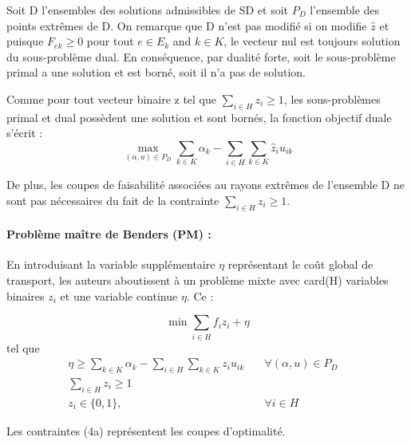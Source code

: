 Soit D l'ensembles des solutions admissibles de SD et soit $P_D$ l'ensemble des points extrêmes de D. On remarque que D n'est pas modifié si on modifie $\hat{z}$ et puisque $F_{ek} \geq 0$ pour tout $e \in E_k$ and $k \in K$, le vecteur nul est toujours solution du sous-problème dual. En conséquence, par dualité forte, soit le sous-problème primal a une solution et est borné, soit il n'a pas de solution.

Comme pour tout vecteur binaire z tel que $\sum_{i \in H} z_i \ge 1$, les sous-problèmes primal et dual possèdent une solution et sont bornés, la fonction objectif duale s'écrit :
\[ \max_{(\alpha,u) \in P_D} \sum_{k \in K}\alpha_k - \sum_{i \in H}\sum_{k \in K} \hat{z}_iu_{ik}\]

De plus, les coupes de faisabilité associées au rayons extrêmes de l'ensemble D ne sont pas nécessaires du fait de la contrainte $\sum_{i \in H} z_i \ge 1$. 




\paragraph{Problème maître de Benders (PM) :} En introduisant la variable supplémentaire $\eta$ représentant le coût global de transport, les auteurs aboutissent à un problème mixte avec card(H) variables binaires $z_i$ et une variable continue $\eta$. Ce :  


\[ \min \sum_{i \in H} f_iz_i + \eta\]
tel que
\begin{subequations}
    \begin{align}
       \eta \ge \sum_{k \in K}\alpha_k - \sum_{i \in H}\sum_{k \in K} z_iu_{ik} \quad &\forall{(\alpha,u) \in P_D}&\\
       \sum_{i \in H} z_i \ge 1 \quad &&\\
        z_i \in \{0,1\}, \quad & \forall{i \in H}&
    \end{align}
\end{subequations}
	

Les contraintes (4a) représentent les coupes d'optimalité.

